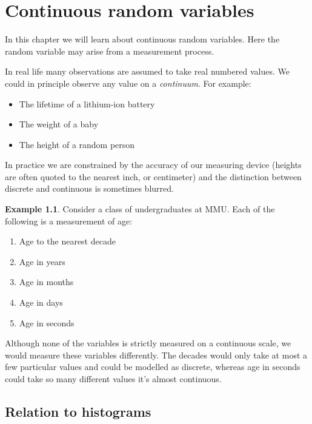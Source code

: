 \documentclass[
]{book}
\theoremstyle{definition}
\theoremstyle{definition}
\newtheorem{example}{Example}[chapter]
\theoremstyle{definition}
\theoremstyle{definition}
\theoremstyle{remark}
\begin{document}
\hypertarget{cont}{%
\chapter{Continuous random variables}\label{cont}}

In this chapter we will learn about continuous random variables. Here the random variable may arise from a measurement process.

In real life many observations are assumed to take real numbered values. We could in principle observe any value on a \emph{continuum}. For example:

\begin{itemize}
\item
  The lifetime of a lithium-ion battery
\item
  The weight of a baby
\item
  The height of a random person
\end{itemize}

In practice we are constrained by the accuracy of our measuring device (heights are often quoted to the nearest inch, or centimeter) and the distinction between discrete and continuous is sometimes blurred.

\begin{example}

Consider a class of undergraduates at MMU. Each of the following is a measurement of age:

\begin{enumerate}
\def\labelenumi{\alph{enumi}.}
\item
  Age to the nearest decade
\item
  Age in years
\item
  Age in months
\item
  Age in days
\item
  Age in seconds
\end{enumerate}

\end{example}

Although none of the variables is strictly measured on a continuous scale, we would measure these variables differently. The decades would only take at most a few particular values and could be modelled as discrete, whereas age in seconds could take so many different values it's almost continuous.

\hypertarget{relation-to-histograms}{%
\section{Relation to histograms}\label{relation-to-histograms}}
\end{document}
